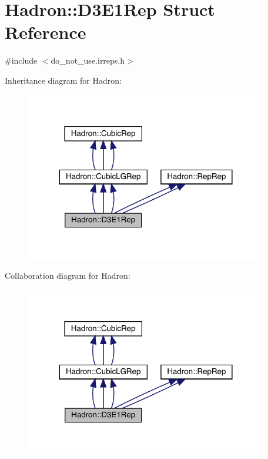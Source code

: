 \hypertarget{structHadron_1_1D3E1Rep}{}\section{Hadron\+:\+:D3\+E1\+Rep Struct Reference}
\label{structHadron_1_1D3E1Rep}


{\ttfamily \#include $<$do\+\_\+not\+\_\+use.\+irreps.\+h$>$}



Inheritance diagram for Hadron\+:
\nopagebreak
\begin{figure}[H]
\begin{center}
\leavevmode
\includegraphics[width=300pt]{d8/d04/structHadron_1_1D3E1Rep__inherit__graph}
\end{center}
\end{figure}


Collaboration diagram for Hadron\+:
\nopagebreak
\begin{figure}[H]
\begin{center}
\leavevmode
\includegraphics[width=300pt]{d6/db5/structHadron_1_1D3E1Rep__coll__graph}
\end{center}
\end{figure}
